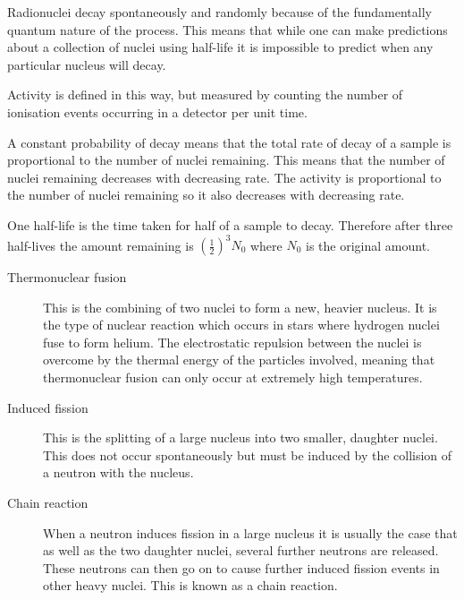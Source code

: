 \documentclass[main.tex]{subfiles}
\begin{document}

Radionuclei decay spontaneously and randomly because of the fundamentally quantum nature of the process. This means that while one can make predictions about a collection of nuclei using half-life it is impossible to predict when any particular nucleus will decay.


Activity is defined in this way, but measured by counting the number of ionisation events occurring in a detector per unit time.


A constant probability of decay means that the total rate of decay of a sample is proportional to the number of nuclei remaining. This means that the number of nuclei remaining decreases with decreasing rate. The activity is proportional to the number of nuclei remaining so it also decreases with decreasing rate.


One half-life is the time taken for half of a sample to decay. Therefore after three half-lives the amount remaining is $\left(\frac{1}{2}\right)^3 N_0$ where $N_0$ is the original amount.


\begin{description}
  \item[Thermonuclear fusion] This is the combining of two nuclei to form a new, heavier nucleus. It is the type of nuclear reaction which occurs in stars where hydrogen nuclei fuse to form helium. The electrostatic repulsion between the nuclei is overcome by the thermal energy of the particles involved,  meaning that thermonuclear fusion can only occur at extremely high temperatures.
  \item[Induced fission] This is the splitting of a large nucleus into two smaller, daughter nuclei. This does not occur spontaneously but must be induced by the collision of a neutron with the nucleus.
  \newpage
  \item[Chain reaction] When a neutron induces fission in a large nucleus it is usually the case that as well as the two daughter nuclei, several further neutrons are released. These neutrons can then go on to cause further induced fission events in other heavy nuclei. This is known as a chain reaction.
\end{description}
\end{document}
